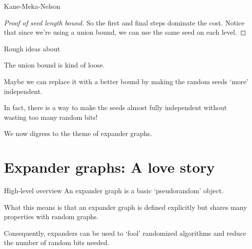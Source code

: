 \documentclass[10pt]{beamer}
\begin{document}
\begin{frame}[allowframebreaks]{Kane-Meka-Nelson}
\begin{proof}[Proof of seed length bound]
    \bigskip
    So the first and final steps dominate the cost.
    Notice that since we're using a union bound, we can use the same
    seed on each level.
  \end{proof}

\end{frame}

\begin{frame}{Rough ideas about \cite{kane2011almost}}

The union bound is kind of loose.

\pause\bigskip\bigskip

Maybe we can replace it with a better bound by making the random seeds
`more' independent.

\pause\bigskip\bigskip

In fact, there is a way to make the seeds almost fully independent
without wasting too many random bits!

\pause\bigskip\bigskip

We now digress to the theme of expander graphs.

\end{frame}


\section{Expander graphs: A love story}

\begin{frame}
  \sectionpage
\end{frame}

\begin{frame}{High-level overview}
  An expander graph is a basic `pseudorandom' object.

  \pause\bigskip\bigskip

  What this means is that an expander graph is defined explicitly but
  shares many properties with random graphs.

  \pause\bigskip\bigskip

  Consequently, expanders can be used to `fool' randomized algorithms
  and reduce the number of random bits needed.
\end{frame}
\end{document}
